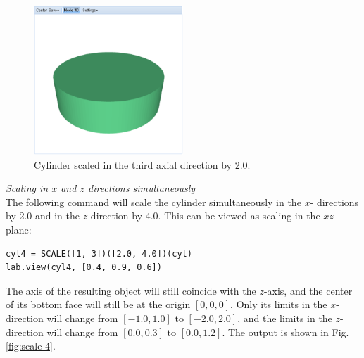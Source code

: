 \documentclass[article,A4,12pt]{llncs}
\begin{document}
\newpage

\begin{figure}[!ht]
\begin{center}
\includegraphics[width=0.5\textwidth]{img/scale-3.png}
\end{center}
\vspace{-2mm}
\caption{Cylinder scaled in the third axial direction by 2.0.}
\label{fig:scale-3}
\end{figure}

\noindent
\underline{\em Scaling in $x$ and $z$ directions simultaneously}\\

The following command will 
scale the cylinder simultaneously in the $x$- directions by 2.0 and in the $z$-direction by 4.0.
This can be viewed as scaling in the $xz$-plane:

\begin{verbatim}
cyl4 = SCALE([1, 3])([2.0, 4.0])(cyl)
lab.view(cyl4, [0.4, 0.9, 0.6])
\end{verbatim}
The axis of the resulting object will still
coincide with the $z$-axis, and the center of its bottom face will
still be at the origin $[0, 0, 0]$. Only its limits in the $x$-direction 
will change from $[-1.0, 1.0]$ to $[-2.0, 2.0]$, and the limits in the 
$z$-direction will change 
from $[0.0, 0.3]$ to $[0.0, 1.2]$. The output is shown in Fig. \ref{fig:scale-4}.

\newpage
\end{document}
